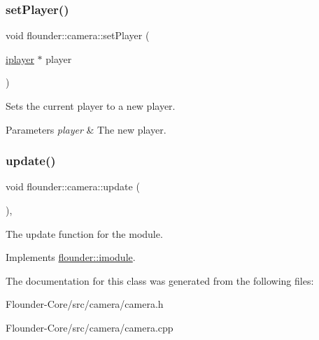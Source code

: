 \subsubsection{\texorpdfstring{set\+Player()}{setPlayer()}}
{\footnotesize\ttfamily void flounder\+::camera\+::set\+Player (\begin{DoxyParamCaption}\item[{\hyperlink{classflounder_1_1iplayer}{iplayer} $\ast$}]{player }\end{DoxyParamCaption})\hspace{0.3cm}{\ttfamily [inline]}}



Sets the current player to a new player. 


\begin{DoxyParams}{Parameters}
{\em player} & The new player. \\
\hline
\end{DoxyParams}
\mbox{\label{classflounder_1_1camera_a6b2da3a1c348764d3cf954db5ac5b357}} 
\subsubsection{\texorpdfstring{update()}{update()}}
{\footnotesize\ttfamily void flounder\+::camera\+::update (\begin{DoxyParamCaption}{ }\end{DoxyParamCaption})\hspace{0.3cm}{\ttfamily [override]}, {\ttfamily [virtual]}}



The update function for the module. 



Implements \hyperlink{classflounder_1_1imodule_a9a53d48a46b5f6b16a92b2cd8503f74a}{flounder\+::imodule}.



The documentation for this class was generated from the following files\+:\begin{DoxyCompactItemize}
\item 
Flounder-\/\+Core/src/camera/camera.\+h\item 
Flounder-\/\+Core/src/camera/camera.\+cpp\end{DoxyCompactItemize}
